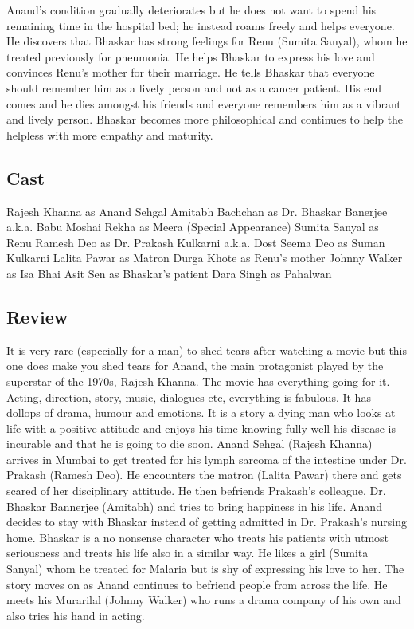 \documentclass[11pt]{article}
\begin{document}
Anand's condition gradually deteriorates but he does not want to spend his remaining time in the 
hospital bed; he instead roams freely and helps everyone. He discovers that Bhaskar has strong 
feelings for Renu (Sumita Sanyal), whom he treated previously for pneumonia. He helps Bhaskar to
express his love and convinces Renu's mother for their marriage. He tells Bhaskar that everyone
should remember him as a lively person and not as a cancer patient. His end comes and he dies 
amongst his friends and everyone remembers him as a vibrant and lively person. Bhaskar becomes
more philosophical and continues to help the helpless with more empathy and maturity.

\subsection*{Cast}
Rajesh Khanna as Anand Sehgal
Amitabh Bachchan as Dr. Bhaskar Banerjee a.k.a. Babu Moshai
Rekha as Meera (Special Appearance)
Sumita Sanyal as Renu
Ramesh Deo as Dr. Prakash Kulkarni a.k.a. Dost
Seema Deo as Suman Kulkarni
Lalita Pawar as Matron
Durga Khote as Renu's mother
Johnny Walker as Isa Bhai
Asit Sen as Bhaskar's patient
Dara Singh as Pahalwan

\subsection*{Review}
It is very rare (especially for a man) to shed tears after watching a movie but this
one does make you shed tears for Anand, the main protagonist played by the superstar
of the 1970s, Rajesh Khanna. The movie has everything going for it. Acting, direction,
story, music, dialogues etc, everything is fabulous. It has dollops of drama, humour 
and emotions. It is a story a dying man who looks at life with a positive attitude 
and enjoys his time knowing fully well his disease is incurable and that he is going
to die soon.
Anand Sehgal (Rajesh Khanna) arrives in Mumbai to get treated for his lymph sarcoma 
of the intestine under Dr. Prakash (Ramesh Deo). He encounters the matron (Lalita Pawar)
there and gets scared of her disciplinary attitude. He then befriends Prakash’s colleague,
Dr. Bhaskar Bannerjee (Amitabh) and tries to bring happiness in his life. Anand decides 
to stay with Bhaskar instead of getting admitted in Dr. Prakash’s nursing home. Bhaskar
is a no nonsense character who treats his patients with utmost seriousness and treats his
life also in a similar way. He likes a girl (Sumita Sanyal) whom he treated for Malaria
but is shy of expressing his love to her. The story moves on as Anand continues to befriend
people from across the life. He meets his Murarilal (Johnny Walker) who runs a drama company
of his own and also tries his hand in acting.
\end{document}

